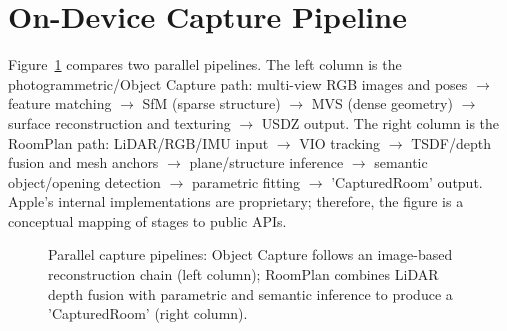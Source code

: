 \section{On-Device Capture Pipeline}
\label{sec:on_device_pipeline}

Figure~\ref{fig:capture_branches} compares two parallel pipelines.  
The left column is the photogrammetric/Object Capture path:
multi-view RGB images and poses $\rightarrow$ feature matching $\rightarrow$ SfM
(sparse structure) $\rightarrow$ MVS (dense geometry) $\rightarrow$ surface reconstruction
and texturing $\rightarrow$ USDZ output.
The right column is the RoomPlan path:
LiDAR/RGB/IMU input $\rightarrow$ VIO tracking $\rightarrow$ TSDF/depth fusion and mesh anchors
$\rightarrow$ plane/structure inference $\rightarrow$ semantic object/opening detection
$\rightarrow$ parametric fitting $\rightarrow$ 'CapturedRoom' output.
Apple’s internal implementations are proprietary; therefore, the figure
is a conceptual mapping of stages to public APIs.


\begin{figure}[H]
\centering

\caption{Parallel capture pipelines: Object Capture follows an 
image-based reconstruction chain (left column); RoomPlan combines 
LiDAR depth fusion with parametric and semantic inference to produce 
a 'CapturedRoom' (right column).}
\label{fig:capture_branches}
\end{figure}

